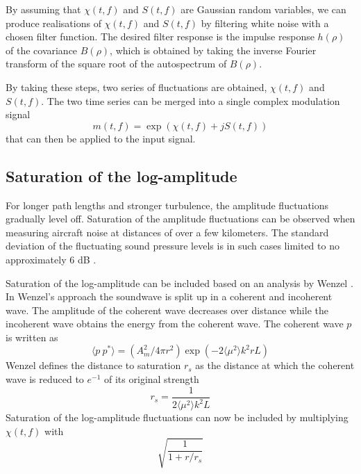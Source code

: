 By assuming that $\chi(t,f)$ and $S(t,f)$ are Gaussian random variables, we can produce realisations of $\chi(t,f)$ and $S(t,f)$ by filtering white noise with a chosen filter function.
The desired filter response is the impulse response $h(\rho)$ of the covariance $B(\rho)$, which is obtained by taking the inverse Fourier transform of the square root of the autospectrum of $B(\rho)$.

By taking these steps, two series of fluctuations are obtained, $\chi(t, f)$ and $S(t, f)$. 
The two time series can be merged into a single complex modulation signal
\begin{equation}
 m(t,f) = \exp{\left( \chi\left(t,f\right) + j S\left(t, f\right) \right)}
\end{equation}
that can then be applied to the input signal.

\subsection{Saturation of the log-amplitude}
For longer path lengths and stronger turbulence, the amplitude fluctuations gradually level off.
Saturation of the amplitude fluctuations can be observed when measuring aircraft noise at distances of over a few kilometers.
The standard deviation of the fluctuating sound pressure levels is in such cases limited to no approximately 6 dB \cite{Daigle1983,Piercy1974}.

Saturation of the log-amplitude can be included based on an analysis by Wenzel \cite{Wenzel1975}.
In Wenzel's approach the soundwave is split up in a coherent and incoherent wave. The amplitude of the coherent wave decreases over distance while the incoherent wave obtains the energy from the coherent wave.
The coherent wave $p$ is written as
\begin{equation}
 \langle p \  p^* \rangle = \left( A_m^2 / 4 \pi r^2 \right) \exp{\left( -2 \langle \mu^2 \rangle k^2 r L \right)}
\end{equation}
Wenzel defines the distance to saturation $r_s$ as the distance at which the coherent wave is reduced to $e^{-1}$ of its original strength
\begin{equation}\label{eq:saturation_distance}
 r_s = \frac{1}{2 \langle \mu^2 \rangle k^2 L}
\end{equation}
Saturation of the log-amplitude fluctuations can now be included by multiplying $\chi(t,f)$ with
\begin{equation}
 \sqrt{ \frac{ 1}{1 + r/r_s}}
\end{equation}


